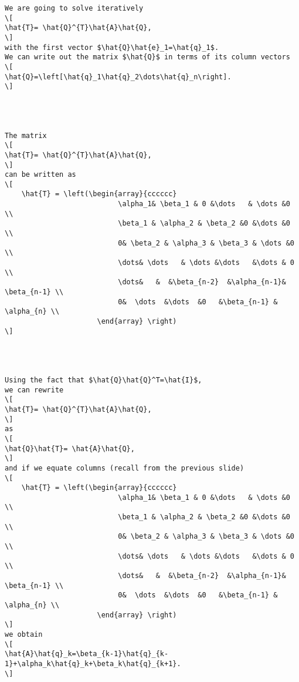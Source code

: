 {\begin{lstlisting}
We are going to solve iteratively
\[
\hat{T}= \hat{Q}^{T}\hat{A}\hat{Q},
\]
with the first vector $\hat{Q}\hat{e}_1=\hat{q}_1$.
We can write out the matrix $\hat{Q}$ in terms of its column vectors 
\[
\hat{Q}=\left[\hat{q}_1\hat{q}_2\dots\hat{q}_n\right].
\]




The matrix
\[
\hat{T}= \hat{Q}^{T}\hat{A}\hat{Q},
\]
can be written as 
\[
    \hat{T} = \left(\begin{array}{cccccc}
                           \alpha_1& \beta_1 & 0 &\dots   & \dots &0 \\
                           \beta_1 & \alpha_2 & \beta_2 &0 &\dots &0 \\
                           0& \beta_2 & \alpha_3 & \beta_3 & \dots &0 \\
                           \dots& \dots   & \dots &\dots   &\dots & 0 \\
                           \dots&   &  &\beta_{n-2}  &\alpha_{n-1}& \beta_{n-1} \\
                           0&  \dots  &\dots  &0   &\beta_{n-1} & \alpha_{n} \\
                      \end{array} \right)
\]




Using the fact that $\hat{Q}\hat{Q}^T=\hat{I}$, 
we can rewrite 
\[
\hat{T}= \hat{Q}^{T}\hat{A}\hat{Q},
\]
as 
\[
\hat{Q}\hat{T}= \hat{A}\hat{Q},
\]
and if we equate columns (recall from the previous slide)
\[
    \hat{T} = \left(\begin{array}{cccccc}
                           \alpha_1& \beta_1 & 0 &\dots   & \dots &0 \\
                           \beta_1 & \alpha_2 & \beta_2 &0 &\dots &0 \\
                           0& \beta_2 & \alpha_3 & \beta_3 & \dots &0 \\
                           \dots& \dots   & \dots &\dots   &\dots & 0 \\
                           \dots&   &  &\beta_{n-2}  &\alpha_{n-1}& \beta_{n-1} \\
                           0&  \dots  &\dots  &0   &\beta_{n-1} & \alpha_{n} \\
                      \end{array} \right)
\]
we obtain
\[
\hat{A}\hat{q}_k=\beta_{k-1}\hat{q}_{k-1}+\alpha_k\hat{q}_k+\beta_k\hat{q}_{k+1}.
\]





\end{lstlisting}}
